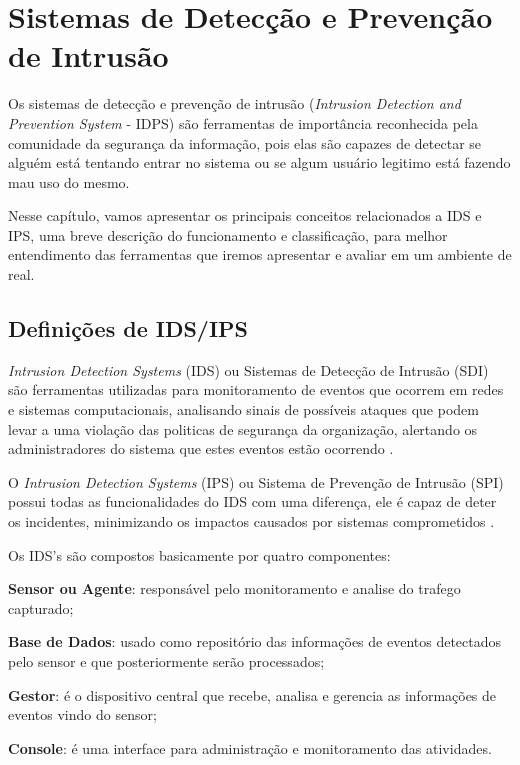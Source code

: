 \chapter{Sistemas de Detecção e Prevenção de Intrusão} \label{ch:idps}

Os sistemas de detecção e prevenção de intrusão (\textit{Intrusion Detection and Prevention System} - IDPS) são ferramentas de importância reconhecida pela comunidade da segurança da informação, pois elas são capazes de detectar se alguém está tentando entrar no sistema ou se algum usuário legitimo está fazendo mau uso do mesmo.

Nesse capítulo, vamos apresentar os principais conceitos relacionados a IDS e IPS, uma breve descrição do funcionamento e classificação, para melhor entendimento das ferramentas que iremos apresentar e avaliar em um ambiente de real.

\section{Definições de IDS/IPS} \label{sec:ipds-definicoes}

\textit{Intrusion Detection Systems} (IDS) ou Sistemas de Detecção de Intrusão (SDI) são ferramentas utilizadas para monitoramento de eventos que ocorrem em redes e sistemas computacionais, analisando sinais de possíveis ataques que podem levar a uma violação das politicas de segurança da organização, alertando os administradores do sistema que estes eventos estão ocorrendo \cite{nagahama2012ipsflow}. 

O \textit{Intrusion Detection Systems} (IPS) ou Sistema de Prevenção de Intrusão (SPI) possui todas as funcionalidades do IDS com uma diferença, ele é capaz de deter os incidentes, minimizando os impactos causados por sistemas comprometidos \cite{mukhopadhyay01}.

Os IDS's são compostos basicamente por quatro componentes:
\begin{alineas}
\item \textbf{Sensor ou Agente}: responsável pelo monitoramento e analise do trafego capturado; 
\item \textbf{Base de Dados}: usado como repositório das informações de eventos detectados pelo sensor e que posteriormente serão processados;
\item \textbf{Gestor}: é o dispositivo central que recebe, analisa e gerencia as informações de eventos vindo do sensor; 
\item \textbf{Console}: é uma interface para administração e monitoramento das atividades.
\end{alineas}


